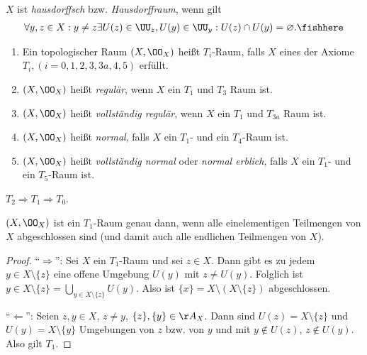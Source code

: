 \begin{defn}
\label{defn:2.1.2}
$X$ ist \emph{hausdorffsch} bzw. \emph{Hausdorffraum}, wenn gilt
\begin{align*}
\forall y,z\in X : y\neq z \exists U(z)\in\UU_z, U(y)\in\UU_y : U(z)\cap U(y) =
\varnothing.\fishhere
\end{align*}
\end{defn}

\begin{defn}
\label{defn:2.1.3}
\begin{enumerate}
  \item Ein topologischer Raum $(X,\OO_X)$ heißt $T_i$-Raum, falls $X$ eines
  der Axiome $T_i, (i=0,1,2,3,3a,4,5)$ erfüllt.
  \item $(X,\OO_X)$ heißt \emph{regulär}, wenn $X$ ein $T_1$ und $T_3$ Raum ist.
  \item $(X,\OO_X)$ heißt \emph{vollständig regulär}, wenn $X$ ein $T_1$ und
  $T_{3a}$ Raum ist.
  \item $(X,\OO_X)$ heißt \emph{normal}, falls $X$ ein $T_1$- und ein
  $T_4$-Raum ist.
  \item $(X,\OO_X)$ heißt \emph{vollständig normal} oder \emph{normal erblich},
  falls $X$ ein $T_1$- und ein $T_5$-Raum ist.\fishhere
\end{enumerate}
\end{defn}

\begin{prop}
\label{prop:2.1.4}
$T_2\Rightarrow T_1\Rightarrow T_0$.\fishhere
\end{prop}

\begin{prop}
\label{prop:2.1.5}
$(X,\OO_X)$ ist ein $T_1$-Raum genau dann, wenn alle einelementigen Teilmengen
von $X$ abgeschlossen sind (und damit auch alle endlichen Teilmengen von
$X$).\fishhere
\end{prop}
\begin{proof}
``$\Rightarrow$'': Sei $X$ ein $T_1$-Raum und sei $z\in X$. Dann gibt es zu
jedem $y\in X\setminus\{z\}$ eine offene Umgebung $U(y)$ mit $z\neq U(y)$.
Folglich ist $y\in X\setminus\{z\} = \bigcup\limits_{y\in X\setminus\{z\}}
U(y)$. Also ist $\{x\} = X\setminus(X\setminus \{z\})$ abgeschlossen.

``$\Leftarrow$'': Seien $z,y\in X$, $z\neq y$, $\{z\}, \{y\} \in \AA_X$. Dann
sind $U(z) = X\setminus \{z\}$ und $U(y) = X\setminus\{y\}$ Umgebungen von $z$
bzw. von $y$ und mit $y\notin U(z)$, $z\notin U(y)$. Also gilt $T_1$.\qedhere
\end{proof}

